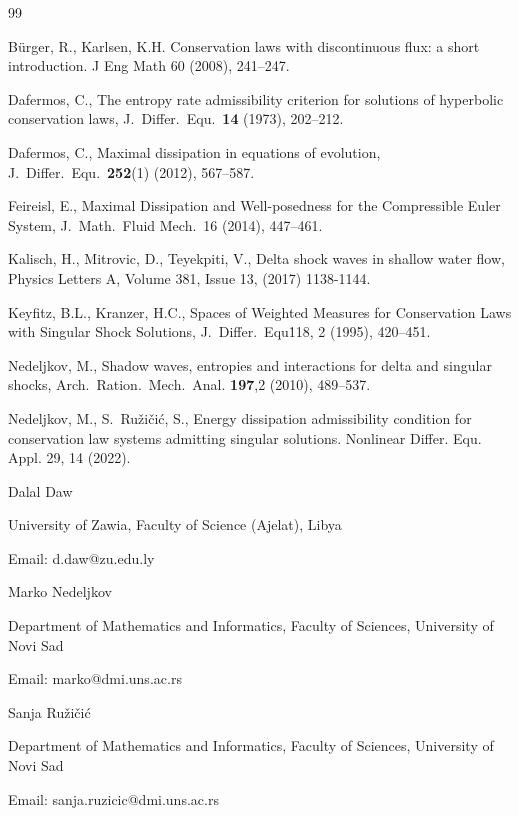 \documentclass{article}
\theoremstyle{plain}
\theoremstyle{definition}
\theoremstyle{remark}
\begin{document}
\begin{thebibliography}{99}

 B\"{u}rger, R., Karlsen, K.H. Conservation laws with 
discontinuous flux: a short introduction. J Eng Math 60 (2008), 241–247.

 Dafermos, C., The entropy rate admissibility criterion for
solutions of hyperbolic conservation laws,
J.\ Differ.\ Equ.\ {\bf 14} (1973), 202--212.

 Dafermos, C., Maximal dissipation in equations of evolution,
J.\ Differ.\ Equ.\ {\bf 252}(1) (2012), 567--587.

 Feireisl, E., Maximal Dissipation and Well-posedness for
the Compressible Euler System, J.\ Math.\ Fluid Mech.\ 16 (2014), 447--461.

 Kalisch, H., Mitrovic, D., Teyekpiti, V.,
Delta shock waves in shallow water flow,
Physics Letters A, Volume 381, Issue 13, (2017) 1138-1144.

 Keyfitz, B.L., Kranzer, H.C.,
Spaces of Weighted Measures for Conservation Laws with Singular Shock Solutions,
J.\ Differ.\ Equ\. 118, 2 (1995), 420--451.

 Nedeljkov, M., Shadow waves,
entropies and interactions for delta and singular shocks,
Arch.\ Ration.\ Mech.\ Anal. {\bf 197},2 (2010), 489--537.

 Nedeljkov, M., S.\ Ružičić, S., 
Energy dissipation admissibility condition for conservation law systems admitting singular solutions. 
Nonlinear Differ. Equ. Appl. 29, 14 (2022).



\end{thebibliography}

\noindent
Dalal Daw 

\noindent
University of Zawia, Faculty of Science (Ajelat), Libya 

\noindent
Email: d.daw@zu.edu.ly
\medskip

\noindent
Marko Nedeljkov 

\noindent
Department of Mathematics and Informatics, Faculty of Sciences, 
University of Novi Sad 

\noindent
Email: marko@dmi.uns.ac.rs

\medskip

\noindent
Sanja Ru\v zi\v ci\' c 

\noindent
Department of Mathematics and Informatics, Faculty of Sciences, 
University of Novi Sad 

\noindent
Email: sanja.ruzicic@dmi.uns.ac.rs
\end{document}
